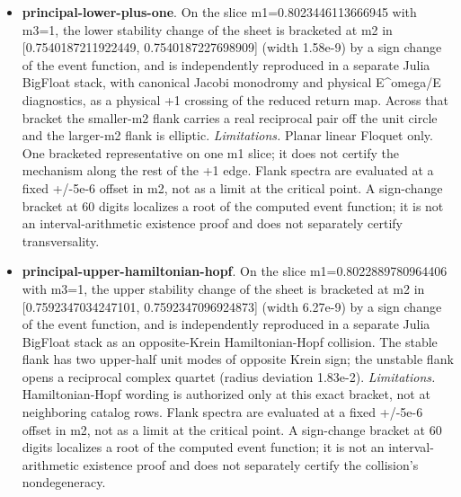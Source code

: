 \begin{itemize}
\item \textbf{principal-lower-plus-one}. On the slice m1=0.8023446113666945 with m3=1, the lower stability change of the sheet is bracketed at m2 in [0.7540187211922449, 0.7540187227698909] (width 1.58e-9) by a sign change of the event function, and is independently reproduced in a separate Julia BigFloat stack, with canonical Jacobi monodromy and physical E\^{}omega/E diagnostics, as a physical +1 crossing of the reduced return map. Across that bracket the smaller-m2 flank carries a real reciprocal pair off the unit circle and the larger-m2 flank is elliptic. \emph{Limitations.} Planar linear Floquet only. One bracketed representative on one m1 slice; it does not certify the mechanism along the rest of the +1 edge. Flank spectra are evaluated at a fixed +/-5e-6 offset in m2, not as a limit at the critical point. A sign-change bracket at 60 digits localizes a root of the computed event function; it is not an interval-arithmetic existence proof and does not separately certify transversality.
\item \textbf{principal-upper-hamiltonian-hopf}. On the slice m1=0.8022889780964406 with m3=1, the upper stability change of the sheet is bracketed at m2 in [0.7592347034247101, 0.7592347096924873] (width 6.27e-9) by a sign change of the event function, and is independently reproduced in a separate Julia BigFloat stack as an opposite-Krein Hamiltonian-Hopf collision. The stable flank has two upper-half unit modes of opposite Krein sign; the unstable flank opens a reciprocal complex quartet (radius deviation 1.83e-2). \emph{Limitations.} Hamiltonian-Hopf wording is authorized only at this exact bracket, not at neighboring catalog rows. Flank spectra are evaluated at a fixed +/-5e-6 offset in m2, not as a limit at the critical point. A sign-change bracket at 60 digits localizes a root of the computed event function; it is not an interval-arithmetic existence proof and does not separately certify the collision's nondegeneracy.

\end{itemize}
